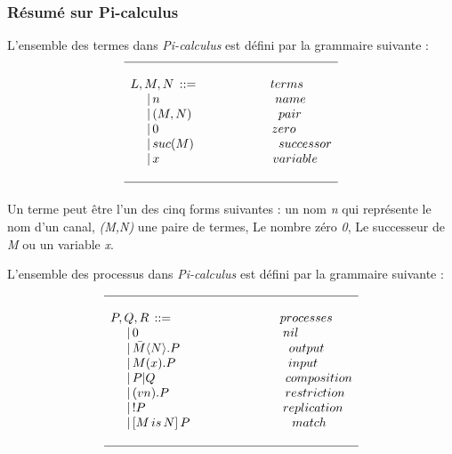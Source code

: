 \documentclass[10pt,a4paper]{article}
\begin{document}
\subsubsection{Résumé sur Pi-calculus}
L'ensemble des termes dans \textit{Pi-calculus} est défini par la grammaire suivante :
\[
\begin{array}{l}
\hline
\\
L,M,N\, ::=\hspace{2cm}terms\\
\,\,\,\,\,\,\,\,\vert\,n\hspace{3cm}\;\;\,name\\
\,\,\,\,\,\,\,\,\vert\,(M,N)\hspace{2cm}\;\;\;\;\,pair\\
\,\,\,\,\,\,\,\,\vert\,0\hspace{3cm}\;\;zero\\
\,\,\,\,\,\,\,\,\vert\,suc(M)\hspace{2cm}\;\;\;\;successor\\
\,\,\,\,\,\,\,\,\vert\,x\hspace{3cm}\;\;variable\\
\\
\hline
\end{array}
\]
\paragraph{}
Un terme peut \^{e}tre l'un des cinq forms suivantes : un nom \textit{n} qui représente le nom d'un canal, \textit{(M,N)} une paire de termes, Le nombre zéro \textit{0}, Le successeur de \textit{M} ou un variable \textit{x}.\newline

L'ensemble des processus dans \textit{Pi-calculus} est défini par la grammaire suivante : 

\[
\begin{array}{l}
\hline
\\
P,Q,R\, ::=\hspace{3cm}processes\\
\,\,\,\,\,\,\,\,\vert\,0\hspace{4cm}\;nil \\
\,\,\,\,\,\,\,\,\vert\,\bar{M}\langle N\rangle.P\hspace{3.1cm}output \\
\,\,\,\,\,\,\,\,\vert\,M(x).P\hspace{3.2cm}input \\
\,\,\,\,\,\,\,\,\vert\,P|Q\hspace{3.7cm}composition \\
\,\,\,\,\,\,\,\,\vert\,(vn).P\hspace{3.3cm}restriction \\
\,\,\,\,\,\,\,\,\vert\,!P\hspace{3.9cm}replication \\
\,\,\,\,\,\,\,\,\vert\,[M\,is\,N]\,P\hspace{2.9cm}match \\
\\
\hline
\end{array}
\]
\end{document}
